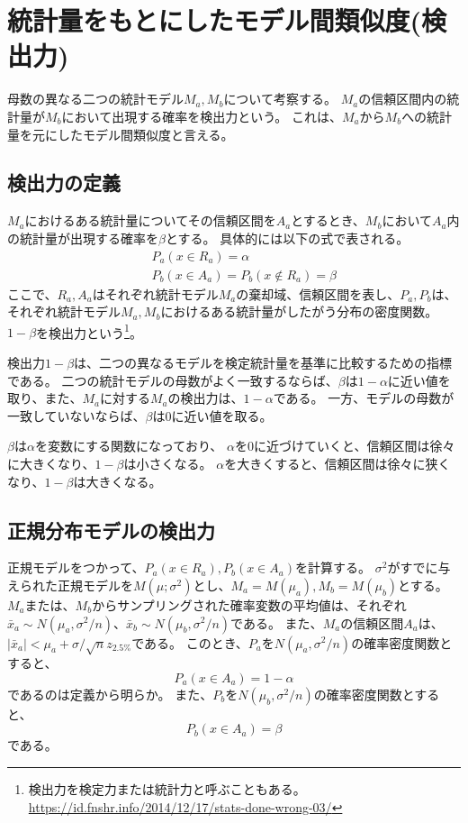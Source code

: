 \section{統計量をもとにしたモデル間類似度(検出力)}
母数の異なる二つの統計モデル$M_a,M_b$について考察する。
$M_a$の信頼区間内の統計量が$M_b$において出現する確率を検出力という。
これは、$M_a$から$M_b$への統計量を元にしたモデル間類似度と言える。

\subsection{検出力の定義}
$M_a$におけるある統計量についてその信頼区間を$A_a$とするとき、$M_b$において$A_a$内の統計量が出現する確率を$\beta$とする。
具体的には以下の式で表される。
\begin{eqnarray*}
    & &P_a(x \in R_a) = \alpha\\
    & & P_b(x \in A_a) = P_b(x\notin R_a )=\beta
\end{eqnarray*}
ここで、$R_a,A_a$はそれぞれ統計モデル$M_a$の棄却域、信頼区間を表し、$P_a,P_b$は、それぞれ統計モデル$M_a,M_b$におけるある統計量がしたがう分布の密度関数。
$1-\beta$を検出力という\footnote{検出力を検定力または統計力と呼ぶこともある。\\ \url{https://id.fnshr.info/2014/12/17/stats-done-wrong-03/}}。


検出力$1-\beta$は、二つの異なるモデルを検定統計量を基準に比較するための指標である。
二つの統計モデルの母数がよく一致するならば、$\beta$は$1-\alpha$に近い値を取り、また、$M_a$に対する$M_a$の検出力は、$1-\alpha$である。
一方、モデルの母数が一致していないならば、$\beta$は0に近い値を取る。

$\beta$は$\alpha$を変数にする関数になっており、
$\alpha$を0に近づけていくと、信頼区間は徐々に大きくなり、$1-\beta$は小さくなる。
$\alpha$を大きくすると、信頼区間は徐々に狭くなり、$1-\beta$は大きくなる。



\subsection{正規分布モデルの検出力}
正規モデルをつかって、$P_a(x \in R_a),P_b(x \in A_a)$を計算する。
$\sigma^2$がすでに与えられた正規モデルを$M(\mu;\sigma^2)$とし、$M_a=M(\mu_a),M_b=M(\mu_b)$とする。
$M_a$または、$M_b$からサンプリングされた確率変数の平均値は、それぞれ$\bar{x}_a\sim N(\mu_a,\sigma^2/n)$、$\bar{x}_b\sim N(\mu_b,\sigma^2/n)$である。
また、$M_a$の信頼区間$A_a$は、$|\bar{x}_a|<\mu_a+\sigma / \sqrt{n}z_{2.5\%}$である。
このとき、$P_a$を$N(\mu_a,\sigma^2/n)$の確率密度関数とすると、
\begin{equation*}
    P_a(x \in A_a) = 1-\alpha
\end{equation*}
であるのは定義から明らか。
また、$P_b$を$N(\mu_b,\sigma^2/n)$の確率密度関数とすると、
\begin{equation*}
    P_b(x \in A_a ) = \beta
\end{equation*}
である。

